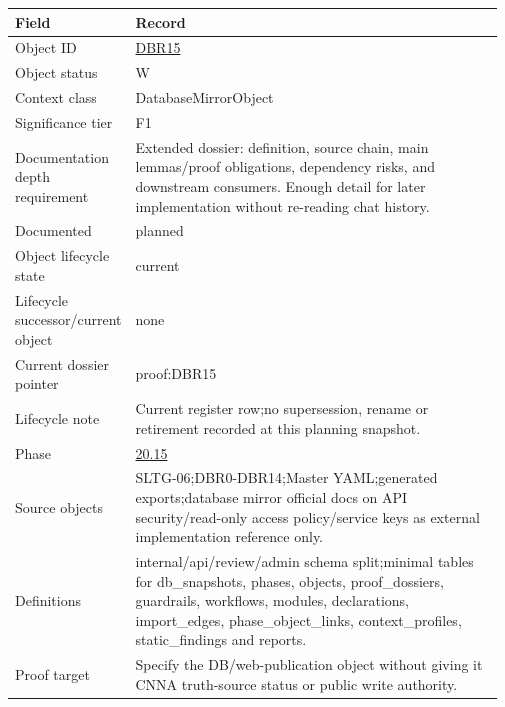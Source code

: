 \begin{longtable}{L{0.16\linewidth} L{0.81\linewidth}}
\hline
\textbf{Field} & \textbf{Record}\\
\hline
Object ID & \hyperlink{object-row-DBR15}{DBR15}\\
\hline\addlinespace[0.20em]
Object status & W\\
\hline\addlinespace[0.20em]
Context class & DatabaseMirrorObject\\
\hline\addlinespace[0.20em]
Significance tier & F1\\
\hline\addlinespace[0.20em]
Documentation depth requirement & Extended dossier: definition, source chain, main lemmas/\allowbreak{}proof obligations, dependency risks, and downstream consumers. Enough detail for later implementation without re-reading chat history.\\
\hline\addlinespace[0.20em]
Documented & planned\\
\hline\addlinespace[0.20em]
Object lifecycle state & current\\
\hline\addlinespace[0.20em]
Lifecycle successor/\allowbreak{}current object & none\\
\hline\addlinespace[0.20em]
Current dossier pointer & proof:DBR15\\
\hline\addlinespace[0.20em]
Lifecycle note & Current register row;\newline no supersession, rename or retirement recorded at this planning snapshot.\\
\hline\addlinespace[0.20em]
Phase & \hyperlink{phase-row-20-15}{20.15}\\
\hline\addlinespace[0.20em]
Source objects & SLTG-06;\newline DBR0-DBR14;\newline Master YAML;\newline generated exports;\newline database mirror official docs on API security/\allowbreak{}read-only access policy/\allowbreak{}service keys as external implementation reference only.\\
\hline\addlinespace[0.20em]
Definitions & internal/\allowbreak{}api/\allowbreak{}review/\allowbreak{}admin schema split;\newline minimal tables for db\_snapshots, phases, objects, proof\_dossiers, guardrails, workflows, modules, declarations, import\_edges, phase\_object\_links, context\_profiles, static\_findings and reports.\\
\hline\addlinespace[0.20em]
Proof target & Specify the DB/\allowbreak{}web-publication object without giving it CNNA truth-source status or public write authority.\\

\end{longtable}
